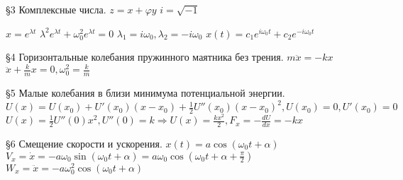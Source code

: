 \documentclass[12pt]{article}
\begin{document}
    \S3 Комплексные числа. \newline
    $z = x + \varphi y$ \newline
    $i = \sqrt{-1}$ \newline

    $x = e^{\lambda t}$ \newline
    $\lambda^2 e^{\lambda t} + \omega_0^2 e^{\lambda t} = 0$ \newline
    $\lambda_1 = i\omega_0, \lambda_2 = -i \omega_0$ \newline
    $x(t) = c_1e^{i\omega_0t} + c_2e^{-i\omega_0t}$ \newline

    \S4 Горизонтальные колебания пружинного маятника без трения. \newline
    $m\ddot x = -kx$ \newline
    $\ddot x + \frac{k}mx = 0, \omega_0^2 = \frac{k}m$ \newline

    \S5 Малые колебания в близи минимума потенциальной энергии. \newline
    $U(x) = U(x_0) + U'(x_0)(x-x_0) + \frac12U''(x_0)(x-x_0)^2, U(x_0) = 0, U'(x_0) = 0$ \newline
    $U(x) = \frac12 U''(0)x^2, U''(0) = k \Rightarrow U(x) = \frac{kx^2}2, F_x = -\frac{dU}{dx} = -kx$ \newline

    \S6 Смещение скорости и ускорения. \newline
    $x(t) = a \cos (\omega_0t + \alpha)$ \newline
    $V_x = \dot x = -a \omega_0 \sin(\omega_0t + \alpha) = a\omega_0\cos(\omega_0t + \alpha+ \frac{\pi}2)$ \newline
    $W_x = \ddot x = -a \omega_0^2 \cos(\omega_0t + \alpha)$ \newline
    
\end{document}
